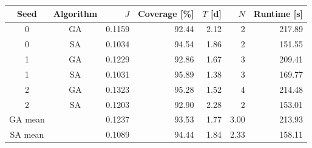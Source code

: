 \begin{tabular}{@{}ccrrrrr@{}}
\toprule
Seed & Algorithm & $J$ & Coverage [\%] & $T$ [d] & $N$ & Runtime [s] \\
\midrule
0 & GA & 0.1159 & 92.44 & 2.12 & 2 & 217.89 \\
0 & SA & 0.1034 & 94.54 & 1.86 & 2 & 151.55 \\
1 & GA & 0.1229 & 92.86 & 1.67 & 3 & 209.41 \\
1 & SA & 0.1031 & 95.89 & 1.38 & 3 & 169.77 \\
2 & GA & 0.1323 & 95.28 & 1.52 & 4 & 214.48 \\
2 & SA & 0.1203 & 92.90 & 2.28 & 2 & 153.01 \\
\midrule
GA mean & & 0.1237 & 93.53 & 1.77 & 3.00 & 213.93 \\
SA mean & & 0.1089 & 94.44 & 1.84 & 2.33 & 158.11 \\
\bottomrule
\end{tabular}
